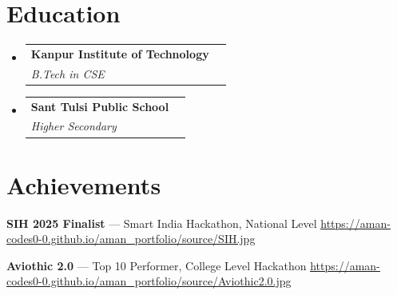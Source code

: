 \documentclass[letterpaper,11pt]{article}
\makeatletter
\newcommand{\resumeSubheading}[4]{
  \vspace{-2pt}\item
    \begin{tabular*}{0.97\textwidth}[t]{l@{\extracolsep{\fill}}r}
      \textbf{\color{olivecolor}#1} & \small #2 \\
      \textit{\small#3} & \textit{\small #4} \\
    \end{tabular*}\vspace{-7pt}
}
\newcommand{\resumeSubHeadingListStart}{\begin{itemize}[leftmargin=0.15in, label={}]}
\newcommand{\resumeSubHeadingListEnd}{\end{itemize}}
\makeatother
\begin{document}
\section{Education}
  \resumeSubHeadingListStart
    \resumeSubheading
      {Kanpur Institute of Technology}{}
      {B.Tech in CSE}{}
    \resumeSubheading
      {Sant Tulsi Public School}{}
      {Higher Secondary}{}
  \resumeSubHeadingListEnd

\section{Achievements}
  \begin{itemize}[leftmargin=0.15in, label={\textbullet}]
    \small{
      \item \textbf{SIH 2025 Finalist} --- Smart India Hackathon, National Level \hfill \href{https://aman-codes0-0.github.io/aman_portfolio/source/SIH.jpg}{\underline{https://aman-codes0-0.github.io/aman\_portfolio/source/SIH.jpg}}
      \item \textbf{Aviothic 2.0} --- Top 10 Performer, College Level Hackathon \hfill \href{https://aman-codes0-0.github.io/aman_portfolio/source/Aviothic2.0.jpg}{\underline{https://aman-codes0-0.github.io/aman\_portfolio/source/Aviothic2.0.jpg}}
    }
  \end{itemize}

\end{document}
